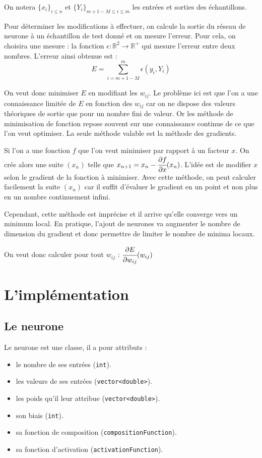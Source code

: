 \medskip

On notera $\{x_i\}_{i \leq n}$ et $\{Y_i\}_{m+1-M \leq i \leq m}$
les entrées et sorties des échantillons.

\medskip

Pour déterminer les modifications à effectuer, on calcule la sortie du réseau
de neurone à un échantillon de test donné et on mesure l'erreur.
Pour cela, on choisira une mesure :
la fonction $\epsilon : \mathbb{R}^2 \to \mathbb{R}^{+}$ qui mesure l'erreur
entre deux nombres. L'erreur ainsi obtenue est :
\[ E = \sum_{i = m+1-M}^m \epsilon(y_i, Y_i)\]

On veut donc minimiser $E$ en modifiant les $w_{ij}$. Le problème ici est que
l'on a une connaissance limitée de $E$ en fonction des $w_{ij}$ car on ne dispose des
valeurs théoriques de sortie que pour un nombre fini de valeur. Or les méthode de
minimisation de fonction repose souvent sur une connaissance continue de ce
que l'on veut optimiser. La seule méthode valable est la méthode des gradients.

\medskip

Si l'on a une fonction $f$ que l'on veut minimiser par rapport à un facteur $x$.
On crée alors une suite $(x_n)$ telle que
$x_{n+1} = x_{n} - \cfrac{\partial f}{\partial x}(x_n)$.
L'idée est de modifier $x$ selon le gradient de la fonction à minimiser. Avec
cette méthode, on peut calculer facilement la suite $(x_n)$ car il suffit
d'évaluer le gradient en un point et non plus en un nombre
continuement infini.

\medskip

Cependant, cette méthode est imprécise et il arrive
qu'elle converge vers un minimum local. En pratique, l'ajout de
neurones va augmenter le nombre de dimension du gradient et donc permettre de
limiter le nombre de minima locaux.

\medskip

On veut donc calculer pour tout
$w_{ij}$ : $\cfrac{\partial E}{\partial w_{ij}}(w_{ij})$

\section{L'implémentation}

\subsection{Le neurone}

Le neurone est une classe, il a pour attributs :
\begin{itemize}
  \item le nombre de ses entrées (\verb+int+).
  \item les valeurs de ses entrées (\verb+vector<double>+).
  \item les poids qu'il leur attribue (\verb+vector<double>+).
  \item son biais (\verb+int+).
  \item sa fonction de composition (\verb+compositionFunction+).
  \item sa fonction d'activation (\verb+activationFunction+).
\end{itemize}

